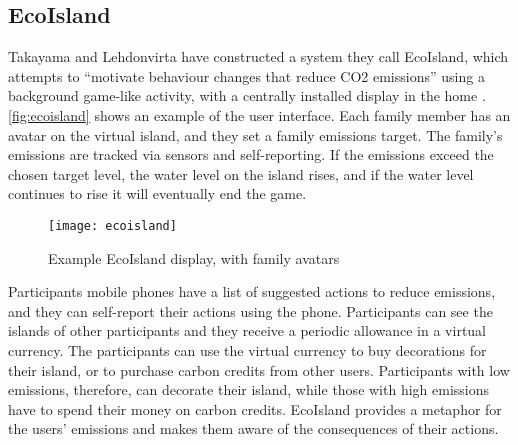 \subsection{EcoIsland}
\label{sec:ecoisland}

Takayama and Lehdonvirta have constructed a system they call EcoIsland, which attempts to ``motivate behaviour changes that reduce CO2 emissions'' using a background game-like activity, with a centrally installed display in the home \cite{takayama-2008}. \autoref{fig:ecoisland} shows an example of the user interface. Each family member has an avatar on the virtual island, and they set a family \COtwo emissions target. The family's emissions are tracked via sensors and self-reporting. If the emissions exceed the chosen target level, the water level on the island rises, and if the water level continues to rise it will eventually end the game.

\begin{figure}[htb]
	\centering
		\texttt{[image: ecoisland]}
		\caption{Example EcoIsland display, with family avatars}
		\label{fig:ecoisland}
\end{figure}

Participants mobile phones have a list of suggested actions to reduce emissions, and they can self-report their actions using the phone. Participants can see the islands of other participants and they receive a periodic allowance in a virtual currency. The participants can use the virtual currency to buy decorations for their island, or to purchase carbon credits from other users. Participants with low emissions, therefore, can decorate their island, while those with high emissions have to spend their money on carbon credits. EcoIsland provides a metaphor for the users' emissions and makes them aware of the consequences of their actions.

